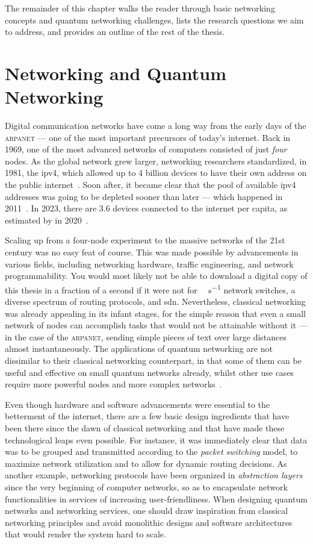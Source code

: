 The remainder of this chapter walks the reader through basic networking concepts and quantum
networking challenges, lists the research questions we aim to address, and provides an outline of
the rest of the thesis.

\section{Networking and Quantum Networking}

Digital communication networks have come a long way from the early days of the \textsc{arpanet} ---
one of the most important precursors of today's internet. Back in 1969, one of the most advanced
networks of computers consisted of just \emph{four} nodes. As the global network grew larger,
networking researchers standardized, in 1981, the \acrfull{ipv4}, which allowed up to \num{4}
billion devices to have their own address on the public internet~\cite{rfc_791}. Soon after, it
became clear that the pool of available \acrshort{ipv4} addresses was going to be depleted sooner
than later --- which happened in 2011~\cite{icann_2011}. In 2023, there are \num{3.6} devices
connected to the internet per capita, as estimated by \citeauthor{cisco_2020} in
2020~\cite{cisco_2020}.

Scaling up from a four-node experiment to the massive networks of the 21st century was no easy feat
of course. This was made possible by advancements in various fields, including networking hardware,
traffic engineering, and network programmability. You would most likely not be able to download a
digital copy of this thesis in a fraction of a second if it were not for \unit{\tera\bit\per\second}
network switches, a diverse spectrum of routing protocols, and \acrlong{sdn}. Nevertheless,
classical networking was already appealing in its infant stages, for the simple reason that even a
small network of nodes can accomplish tasks that would not be attainable without it --- in the case
of the \textsc{arpanet}, sending simple pieces of text over large distances almost instantaneously.
The applications of quantum networking are not dissimilar to their classical networking counterpart,
in that some of them can be useful and effective on small quantum networks already, whilst other use
cases require more powerful nodes and more complex networks~\cite{wehner_2018_stages}.

Even though hardware and software advancements were essential to the betterment of the internet,
there are a few basic design ingredients that have been there since the dawn of classical networking
and that have made these technological leaps even possible. For instance, it was immediately clear
that data was to be grouped and transmitted according to the \emph{packet switching} model, to
maximize network utilization and to allow for dynamic routing decisions. As another example,
networking protocols have been organized in \emph{abstraction layers} since the very beginning of
computer networks, so as to encapsulate network functionalities in services of increasing
user-friendliness. When designing quantum networks and networking services, one should draw
inspiration from classical networking principles and avoid monolithic designs and software
architectures that would render the system hard to scale.

